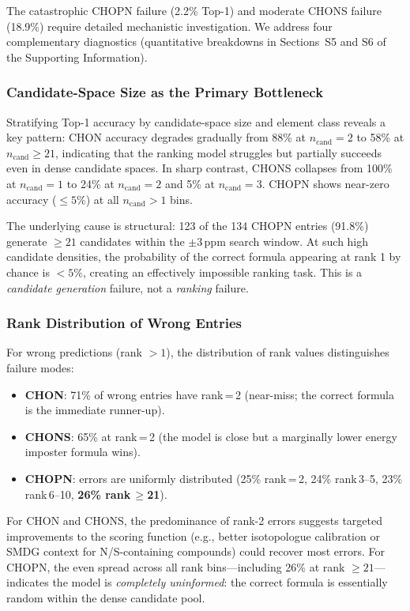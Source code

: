 \documentclass[journal=jcisd8]{achemso}
\begin{document}
The catastrophic CHOPN failure (2.2\% Top-1) and moderate CHONS failure (18.9\%)
require detailed mechanistic investigation.  We address four complementary diagnostics
(quantitative breakdowns in Sections~S5 and S6 of the Supporting Information).

\subsubsection{Candidate-Space Size as the Primary Bottleneck}

Stratifying Top-1 accuracy by candidate-space size and element class reveals a key pattern: CHON accuracy degrades
gradually from 88\% at $n_\text{cand}=2$ to 58\% at $n_\text{cand}\ge21$, indicating
that the ranking model struggles but partially succeeds even in dense candidate spaces.
In sharp contrast, CHONS collapses from 100\% at $n_\text{cand}=1$ to 24\% at
$n_\text{cand}=2$ and 5\% at $n_\text{cand}=3$.  CHOPN shows near-zero accuracy
($\le5\%$) at all $n_\text{cand}>1$ bins.

The underlying cause is structural: 123 of the 134 CHOPN entries (91.8\%) generate
$\ge21$ candidates within the $\pm3$\,ppm search window.  At such high candidate
densities, the probability of the correct formula appearing at rank 1 by chance is
$<5\%$, creating an effectively impossible ranking task.  This is a \emph{candidate
generation} failure, not a \emph{ranking} failure.

\subsubsection{Rank Distribution of Wrong Entries}

For wrong predictions (rank $>1$), the distribution of rank values distinguishes
failure modes:

\begin{itemize}[nosep]
  \item \textbf{CHON}: 71\% of wrong entries have rank\,=\,2 (near-miss; the correct
    formula is the immediate runner-up).
  \item \textbf{CHONS}: 65\% at rank\,=\,2 (the model is close but a marginally lower
    energy imposter formula wins).
  \item \textbf{CHOPN}: errors are uniformly distributed (25\% rank\,=\,2, 24\%
    rank\,3--5, 23\% rank\,6--10, \textbf{26\% rank\,$\ge$21}).
\end{itemize}

For CHON and CHONS, the predominance of rank-2 errors suggests targeted improvements
to the scoring function (e.g., better isotopologue calibration or SMDG context for
N/S-containing compounds) could recover most errors.  For CHOPN, the even spread
across all rank bins---including 26\% at rank $\ge21$---indicates the model is
\emph{completely uninformed}: the correct formula is essentially random within the
dense candidate pool.
\end{document}
